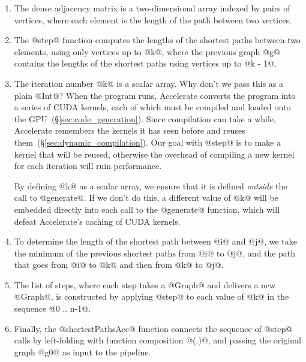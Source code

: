 \begin{enumerate}
\item The dense adjacency matrix is a two-dimensional array indexed by pairs of
    vertices, where each element is the length of the path between two vertices.

\item The @step@ function computes the lengths of the shortest paths between two
    elements, using only vertices up to @k@, where the previous graph @g@
    contains the lengths of the shortest paths using vertices up to @k - 1@.

\item The iteration number @k@ is a scalar array. Why don't we pass this as a
    plain @Int@? When the program runs, Accelerate converts the program into a
    series of CUDA kernels, each of which must be compiled and loaded onto the
    GPU~(\S\ref{sec:code_generation}). Since compilation can take a while,
    Accelerate remembers the kernels it has seen before and reuses
    them~(\S\ref{sec:dynamic_compilation}). Our goal with @step@ is to make a
    kernel that will be reused, otherwise the overhead of compiling a new kernel
    for each iteration will ruin performance.

    By defining @k@ as a scalar array, we ensure that it is defined
    \emph{outside} the call to @generate@. If we don't do this, a different
    value of @k@ will be embedded directly into each call to the @generate@
    function, which will defeat Accelerate's caching of CUDA kernels.

\item To determine the length of the shortest path between @i@ and @j@, we take
    the minimum of the previous shortest paths from @i@ to @j@, and the path
    that goes from @i@ to @k@ and then from @k@ to @j@.

\item The list of steps, where each step takes a @Graph@ and delivers a new
    @Graph@, is constructed by applying @step@ to each value of @k@ in the
    sequence @0 .. n-1@.

\item Finally, the @shortestPathsAcc@ function connects the sequence of @step@
    calls by left-folding with function composition @(.)@, and passing the
    original graph @g0@ as input to the pipeline.

\end{enumerate}

%

